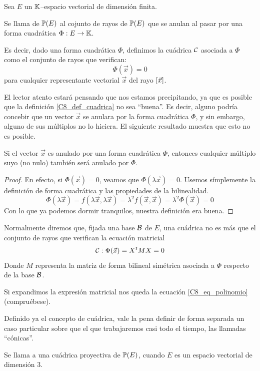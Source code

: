 Sea $E$ un $\mathbb{K}$--espacio vectorial de dimensión finita.
\begin{defi}[Cuádrica]
	\label{C8_def_cuadrica}
	Se llama  de $\mathbb{P}(E)$ al cojunto de rayos de $\mathbb{P}(E)$ que se anulan al pasar por una forma cuadrática $\Phi:E\to\mathbb{K}$.
	
	Es decir, dado una forma cuadrática $\Phi$, definimos la cuádrica $\mathcal{C}$ asociada a $\Phi$ como el conjunto de rayos que verifican:
	\[\Phi(\vec{x})=0\]
	para cualquier representante vectorial $\vec{x}$ del rayo $\left [ \vec{x} \right ]$.
\end{defi}
El lector atento estará pensando que nos estamos precipitando, ya que es posible que la definición \ref{C8_def_cuadrica} no sea ``buena''. Es decir, alguno podría concebir que un vector $\vec{x}$ se anulara por la forma cuadrática $\Phi$, y sin embargo, alguno de sus múltiplos no lo hiciera. El siguiente resultado muestra que esto no es posible.
\begin{lem}
	Si el vector $\vec{x}$ es anulado por una forma cuadrática $\Phi$, entonces cualquier múltiplo suyo (no nulo) también será anulado por $\Phi$.
\end{lem}
\begin{proof}
	En efecto, si $\Phi(\vec{x})=0$, veamos que $\Phi(\lambda \vec{x})=0$. Usemos símplemente la definición de forma cuadrática y las propiedades de la bilinealidad.
	\[\Phi(\lambda \vec{x})=f(\lambda \vec{x},\lambda \vec{x})=\lambda^2f(\vec{x},\vec{x})=\lambda^2\Phi(\vec{x})=0\]
	Con lo que ya podemos dormir tranquilos, nuestra definición era buena.
\end{proof}
\begin{obs}
	\label{C8_obs_ecuacionMatricial}
	Normalmente diremos que, fijada una base $\mathcal{B}$ de $E$, una cuádrica no es más que el conjunto de rayos que verifican la ecuación matricial
	\begin{equation}
		\mathcal{C}:\Phi(\vec{x})=X^tMX=0
	\end{equation}
	Donde $M$ representa la matriz de forma bilineal simétrica asociada a $\Phi$ respecto de la base $\mathcal{B}$.
	
	Si expandimos la expresión matricial nos queda la ecuación \eqref{C8_eq_polinomio} (compruébese).
\end{obs}
Definido ya el concepto de cuádrica, vale la pena definir de forma separada un caso particular sobre que el que trabajaremos casi todo el tiempo, las llamadas ``cónicas''.
\begin{defi}[Cónica]
	Se llama  a una cuádrica proyectiva de $\mathbb{P}(E)$, cuando $E$ es un espacio vectorial de dimensión $3$.
\end{defi}
